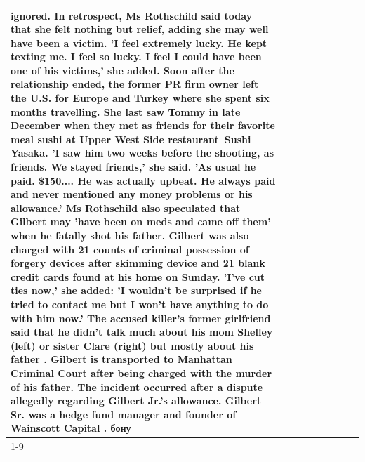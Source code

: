 \begin{table}[H]
\begin{tabular}{lllrlllll}
ignored. In retrospect, Ms Rothschild said today that she felt nothing but relief, adding she may well have been a victim. 'I feel extremely lucky. He kept texting me. I feel so lucky. I feel I could have been one of his victims,' she added. Soon after the relationship ended, the former PR firm owner left the U.S. for Europe and Turkey where she spent six months  travelling. She last saw Tommy in late December when they met as friends for their favorite meal sushi at Upper West Side restaurant Sushi Yasaka. 'I saw him two weeks before the shooting, as friends. We stayed friends,' she said. 'As usual he paid. \$150.... He was actually upbeat. He always paid and never mentioned any money problems or his allowance.' Ms Rothschild also speculated that Gilbert may 'have been on meds and came off them' when he fatally shot his father. Gilbert was also charged with 21 counts of criminal possession of forgery devices after skimming device and 21 blank credit cards found at his home on Sunday. 'I've cut ties now,' she added: 'I wouldn’t be surprised if he tried to contact me but I won’t have anything to do with him now.' The accused killer's former girlfriend said that he didn't talk much about his mom Shelley (left) or sister Clare (right) but mostly about his father . Gilbert is transported to Manhattan Criminal Court  after being charged with the murder of his father. The incident occurred after a dispute allegedly regarding Gilbert Jr.'s allowance. Gilbert Sr. was a hedge fund manager and founder of Wainscott Capital . бону \\
\cline{1-9}

\end{tabular}
\end{table}
